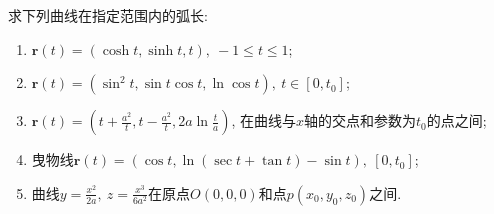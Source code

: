 \documentclass[../../main.tex]{subfiles}%
\begin{document}
\begin{example}
求下列曲线在指定范围内的弧长:
\begin{enumerate}[(1)]
\item $\bm{r}(t) = (\cosh t, \sinh t, t),\ -1 \leqslant t \leqslant 1$;
\item $\bm{r}(t) = (\sin^2 t, \sin t \cos t, \ln \cos t),\ t\in[0, t_0]$;
\item $\bm{r}(t) = \left(t + \frac{a^2}{t}, t - \frac{a^2}{t}, 2a \ln \frac{t}{a}\right)$, 在曲线与$x$轴的交点和参数为$t_0$的点之间;
\item 曳物线$\bm{r}(t) = (\cos t, \ln(\sec t + \tan t) - \sin t),\ [0, t_0]$;
\item 曲线$y = \frac{x^2}{2a},\ z = \frac{x^3}{6a^2}$在原点$O(0,0,0)$和点$p(x_0, y_0, z_0)$之间.
\end{enumerate}
\end{example}
\end{document}
